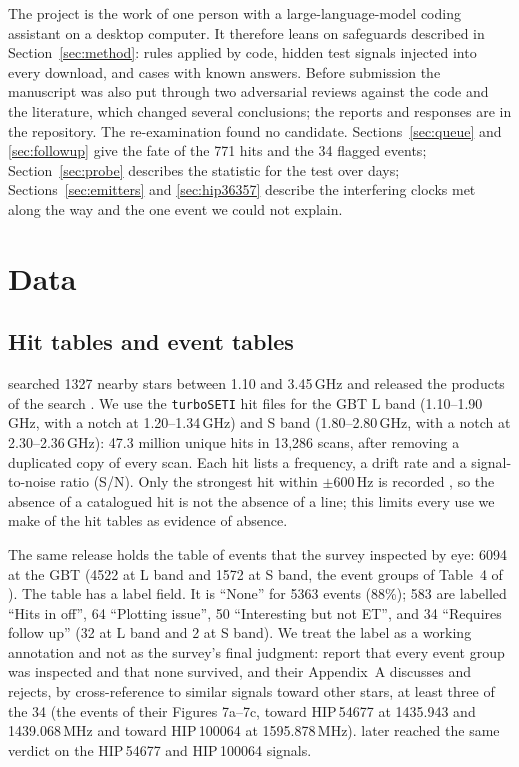 \documentclass[twocolumn]{aastex631}
\newcommand{\sn}{S/N}
\begin{document}
The project is the work of one person with a large-language-model coding
assistant on a desktop computer. It therefore leans on safeguards described
in Section~\ref{sec:method}: rules applied by code, hidden test signals
injected into every download, and cases with known answers. Before
submission the manuscript was also put through two adversarial reviews
against the code and the literature, which changed several conclusions; the
reports and responses are in the repository. The re-examination found no
candidate. Sections~\ref{sec:queue} and \ref{sec:followup} give the fate of
the 771 hits and the 34 flagged events; Section~\ref{sec:probe} describes
the statistic for the test over days; Sections~\ref{sec:emitters} and
\ref{sec:hip36357} describe the interfering clocks met along the way and
the one event we could not explain.

\section{Data} \label{sec:data}

\subsection{Hit tables and event tables}

\citet{Price2020} searched 1327 nearby stars between 1.10 and 3.45\,GHz and
released the products of the search \citep{PriceZenodo}. We use the
\texttt{turboSETI} hit files for the GBT L band (1.10--1.90\,GHz, with a
notch at 1.20--1.34\,GHz) and S band (1.80--2.80\,GHz, with a notch at
2.30--2.36\,GHz): 47.3 million unique hits in 13,286 scans, after removing a
duplicated copy of every scan. Each hit lists a frequency, a drift rate and
a signal-to-noise ratio (\sn). Only the strongest hit within $\pm600$\,Hz is
recorded \citep{Price2020}, so the absence of a catalogued hit is not the
absence of a line; this limits every use we make of the hit tables as
evidence of absence.

The same release holds the table of events that the survey inspected by eye:
6094 at the GBT (4522 at L band and 1572 at S band, the event groups of
Table~4 of \citealt{Price2020}). The table has a label field. It is
``None'' for 5363 events (88\%); 583 are labelled ``Hits in off'', 64
``Plotting issue'', 50 ``Interesting but not ET'', and 34 ``Requires follow
up'' (32 at L band and 2 at S band). We treat the label as a working
annotation and not as the survey's final judgment: \citet{Price2020} report
that every event group was inspected and that none survived, and their
Appendix~A discusses and rejects, by cross-reference to similar signals
toward other stars, at least three of the 34 (the events of their Figures
7a--7c, toward HIP\,54677 at 1435.943 and 1439.068\,MHz and toward
HIP\,100064 at 1595.878\,MHz). \citet{Painter2025} later reached the same
verdict on the HIP\,54677 and HIP\,100064 signals.
\end{document}
